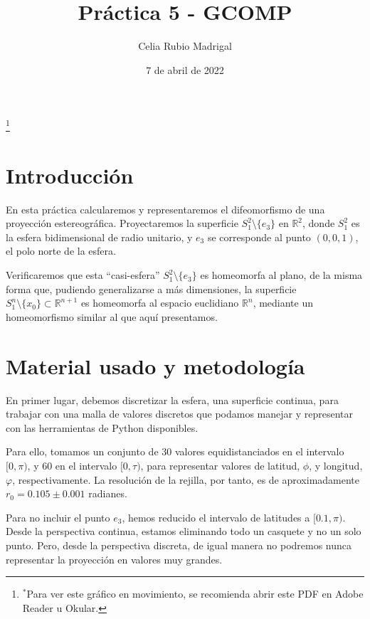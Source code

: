 \documentclass[a4paper]{article}
\author{Celia Rubio Madrigal}
\title{Práctica 5 - GCOMP}
\date{7 de abril de 2022}
\begin{document}
	\maketitle
	
	\tableofcontents
	
	\vfill
	
	\begin{center}
		\renewcommand{\thefootnote}{}\footnote{$^*$Para ver este gráfico en movimiento, se recomienda abrir este PDF en Adobe Reader u Okular.}
	\end{center}
	
	
	\vfill
	\newpage
	
	\section{Introducción}
	En esta práctica calcularemos y representaremos el difeomorfismo
	de una proyección estereográfica. Proyectaremos la superficie $S_1^2\setminus\{e_3\}$ en $\mathbb{R}^2$, donde $S_1^2$ es la esfera bidimensional de radio unitario, y $e_3$ se corresponde al punto $(0,0,1)$, el polo norte de la esfera.
	
	Verificaremos que esta ``casi-esfera'' $S_1^2\setminus\{e_3\}$ es homeomorfa al plano, de la misma forma que, pudiendo generalizarse a más dimensiones, la superficie $S_1^n\setminus\{x_0\}\subset\mathbb{R}^{n+1}$ es homeomorfa al espacio euclidiano $\mathbb{R}^n$, mediante un homeomorfismo similar al que aquí presentamos.
	
	
	\section{Material usado y metodología}
	En primer lugar, debemos discretizar la esfera, una superficie continua, para trabajar con una malla de valores discretos que podamos manejar y representar con las herramientas de Python disponibles.
	
	Para ello, tomamos un conjunto de 30 valores equidistanciados en el intervalo $[0,\pi)$, y 60 en el intervalo $[0,\tau)$, para representar valores de latitud, $\phi$, y longitud, $\varphi$, respectivamente. La resolución de la rejilla, por tanto, es de aproximadamente $r_0=0.105\pm0.001$ radianes.
	
	Para no incluir el punto $e_3$, hemos reducido el intervalo de latitudes a $[0.1,\pi)$. Desde la perspectiva continua, estamos eliminando todo un casquete y no un solo punto. Pero, desde la perspectiva discreta, de igual manera no podremos nunca representar la proyección en valores muy grandes.
	
\end{document}
